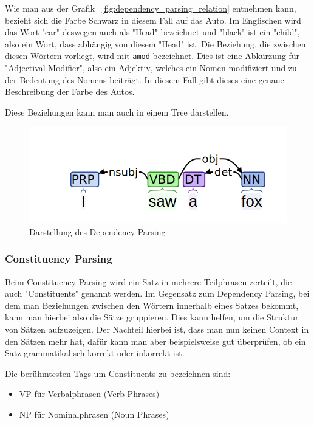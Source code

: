 Wie man aus der Grafik ~\ref{fig:dependency_parsing_relation} entnehmen kann, bezieht sich die Farbe Schwarz in diesem Fall auf das Auto.
Im Englischen wird das Wort "car" deswegen auch als "Head" bezeichnet und "black" ist ein "child", also ein Wort, dass abhängig von diesem "Head" ist.
Die Beziehung, die zwischen diesen Wörtern vorliegt, wird mit \texttt{amod} bezeichnet.
Dies ist eine Abkürzung für "Adjectival Modifier", also ein Adjektiv, welches ein Nomen modifiziert und zu der Bedeutung des Nomens beiträgt.
In diesem Fall gibt dieses eine genaue Beschreibung der Farbe des Autos.\cite{dependencyParsing}

Diese Beziehungen kann man auch in einem Tree darstellen.

\begin{figure}[hbt!]
    \centering
    \includegraphics[scale=0.5]{pics/dependency_parse_tree}
    \caption{Darstellung des Dependency Parsing~\cite{dependencyVsConstituencyParsing}}
    \label{fig:dependency_parsing_tree}
\end{figure}

\subsubsection{Constituency Parsing}

Beim Constituency Parsing wird ein Satz in mehrere Teilphrasen zerteilt, die auch "Constituents" genannt werden.
Im Gegensatz zum Dependency Parsing, bei dem man Beziehungen zwischen den Wörtern innerhalb eines Satzes bekommt, kann man hierbei also die Sätze gruppieren.
Dies kann helfen, um die Struktur von Sätzen aufzuzeigen.
Der Nachteil hierbei ist, dass man nun keinen Context in den Sätzen mehr hat, dafür kann man aber beispielsweise gut überprüfen, ob ein Satz grammatikalisch korrekt oder inkorrekt ist.\cite{machineLearningTextAnalysis}

Die berühmtesten Tags um Constituents zu bezeichnen sind:

\begin{itemize}
    \item VP für Verbalphrasen (Verb Phrases)
    \item NP für Nominalphrasen (Noun Phrases)
\end{itemize}

